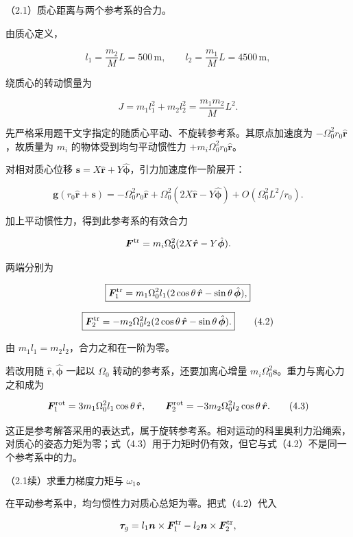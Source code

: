 \documentclass[12pt,a4paper,fontset=fandol]{ctexart}
\begin{document}
（2.1）质心距离与两个参考系的合力。

由质心定义，

\[
l_1=\frac{m_2}{M}L=500\,\mathrm m,\qquad
l_2=\frac{m_1}{M}L=4500\,\mathrm m,
\]

绕质心的转动惯量为

\[
J=m_1l_1^2+m_2l_2^2=\frac{m_1m_2}{M}L^2.
\tag{4.1}
\]

先严格采用题干文字指定的随质心平动、不旋转参考系。其原点加速度为
\(-\Omega_0^2r_0\hat{\boldsymbol r}\)，故质量为 \(m_i\)
的物体受到均匀平动惯性力 \(+m_i\Omega_0^2r_0\hat{\boldsymbol r}\)。

对相对质心位移
\(\boldsymbol s=X\hat{\boldsymbol r}+Y\hat{\boldsymbol\phi}\)，引力加速度作一阶展开：

\[
\boldsymbol g(r_0\hat{\boldsymbol r}+\boldsymbol s)
=-\Omega_0^2r_0\hat{\boldsymbol r}
+\Omega_0^2(2X\hat{\boldsymbol r}-Y\hat{\boldsymbol\phi})
+O\!\left(\Omega_0^2L^2/r_0\right).
\]

加上平动惯性力，得到此参考系的有效合力

\[
\boldsymbol F^{\rm tr}
=m_i\Omega_0^2(2X\hat{\boldsymbol r}-Y\hat{\boldsymbol\phi}).
\]

两端分别为

\[
\boxed{\boldsymbol F_1^{\rm tr}
=m_1\Omega_0^2l_1(2\cos\theta\,\hat{\boldsymbol r}
-\sin\theta\,\hat{\boldsymbol\phi}),}
\]

\[
\boxed{\boldsymbol F_2^{\rm tr}
=-m_2\Omega_0^2l_2(2\cos\theta\,\hat{\boldsymbol r}
-\sin\theta\,\hat{\boldsymbol\phi}).}
\tag{4.2}
\]

由 \(m_1l_1=m_2l_2\)，合力之和在一阶为零。

若改用随 \(\hat{\boldsymbol r},\hat{\boldsymbol\phi}\) 一起以
\(\Omega_0\) 转动的参考系，还要加离心增量
\(m_i\Omega_0^2\boldsymbol s\)。重力与离心力之和成为

\[
\boldsymbol F_1^{\rm rot}=3m_1\Omega_0^2l_1\cos\theta\,\hat{\boldsymbol r},
\qquad
\boldsymbol F_2^{\rm rot}=-3m_2\Omega_0^2l_2\cos\theta\,\hat{\boldsymbol r}.
\tag{4.3}
\]

这正是参考解答采用的表达式，属于旋转参考系。相对运动的科里奥利力沿绳索，对质心的姿态力矩为零；式（4.3）用于力矩时仍有效，但它与式（4.2）不是同一个参考系中的力。

（2.1续）求重力梯度力矩与 \(\omega_1\)。

在平动参考系中，均匀惯性力对质心总矩为零。把式（4.2）代入

\[
\boldsymbol\tau_g=l_1\boldsymbol n\times\boldsymbol F_1^{\rm tr}
-l_2\boldsymbol n\times\boldsymbol F_2^{\rm tr},
\]
\end{document}
